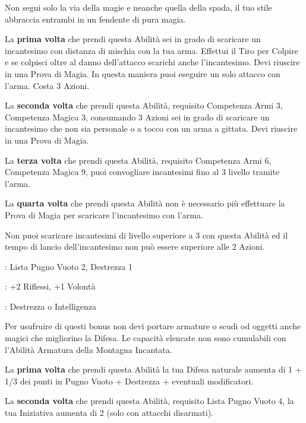 \begin{multicols}{2}
Non segui solo la via della magie e neanche quella della spada, il tuo stile abbraccia entrambi in un fendente di pura magia.

La \textbf{prima volta} che prendi questa Abilità sei in grado di scaricare un incantesimo con distanza di mischia con la tua arma. Effettui il Tiro per Colpire e se colpisci oltre al danno dell'attacco scarichi anche l'incantesimo. Devi riuscire in una Prova di Magia. In questa maniera puoi eseguire un solo attacco con l'arma. Costa 3 Azioni.

La \textbf{seconda volta} che prendi questa Abilità, requisito Competenza Armi 3, Competenza Magica 3, consumando 3 Azioni sei in grado di scaricare un incantesimo che non sia personale o a tocco con un arma a gittata. Devi riuscire in una Prova di Magia.

La \textbf{terza volta} che prendi questa Abilità, requisito Competenza Armi 6, Competenza Magica 9, puoi convogliare incantesimi fino al 3 livello tramite l'arma.

La \textbf{quarta volta} che prendi questa Abilità non è necessario più effettuare la Prova di Magia per scaricare l'incantesimo con l'arma.

Non puoi scaricare incantesimi di livello superiore a 3 con questa Abilità ed il tempo di lancio dell'incantesimo non può essere superiore alle 2 Azioni.

\begin{description}[noitemsep, topsep=0pt, parsep=0pt, partopsep=0pt, leftmargin=0cm, labelwidth=2.5cm]
    \item[\textbf{Requisito}]: Lista Pugno Vuoto 2, Destrezza 1
    \item[\textbf{Tiri Salvezza}]: +2 Riflessi, +1 Volontà
    \item[\textbf{Caratteristica}]: Destrezza o Intelligenza
\end{description}

Per usufruire di questi bonus non devi portare armature o scudi od oggetti anche magici che migliorino la Difesa. Le capacità elencate non sono cumulabili con l'Abilità Armatura della Montagna Incantata.

La \textbf{prima volta} che prendi questa Abilità la tua Difesa naturale aumenta di 1 + 1/3 dei punti in Pugno Vuoto + Destrezza + eventuali modificatori.

La \textbf{seconda volta} che prendi questa Abilità, requisito Lista Pugno Vuoto 4, la tua Iniziativa aumenta di 2 (solo con attacchi disarmati).


\end{multicols}
